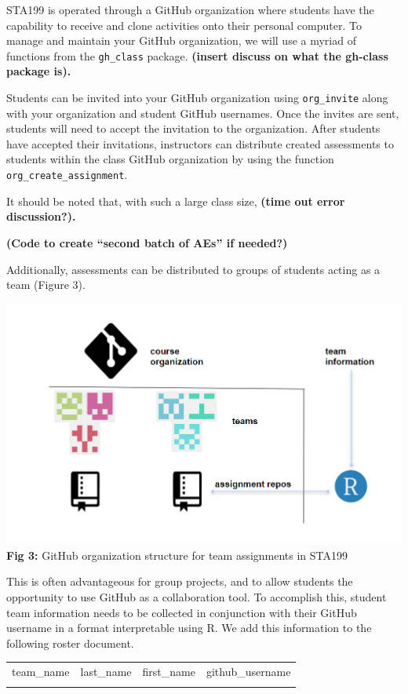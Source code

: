 \documentclass[
  12pt]{article}
\begin{document}
STA199 is operated through a GitHub organization where students have the
capability to receive and clone activities onto their personal computer.
To manage and maintain your GitHub organization, we will use a myriad of
functions from the \texttt{gh\_class} package. \textbf{(insert discuss
on what the gh-class package is).}

Students can be invited into your GitHub organization using
\texttt{org\_invite} along with your organization and student GitHub
usernames. Once the invites are sent, students will need to accept the
invitation to the organization. After students have accepted their
invitations, instructors can distribute created assessments to students
within the class GitHub organization by using the function
\texttt{org\_create\_assignment}.

It should be noted that, with such a large class size, \textbf{(time out
error discussion?).}

\textbf{(Code to create ``second batch of AEs'' if needed?)}

Additionally, assessments can be distributed to groups of students
acting as a team (Figure 3).

\includegraphics{images/teamorg.png} \textbf{Fig 3:} GitHub organization
structure for team assignments in STA199

This is often advantageous for group projects, and to allow students the
opportunity to use GitHub as a collaboration tool. To accomplish this,
student team information needs to be collected in conjunction with their
GitHub username in a format interpretable using R. We add this
information to the following roster document.

\begin{longtable}[]{@{}llll@{}}
\toprule()
\endhead
team\_name & last\_name & first\_name & github\_username \\
& & & \\
\bottomrule()
\end{longtable}
\end{document}
